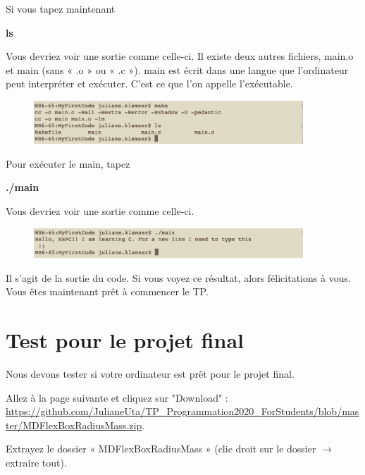 \documentclass{article}
\begin{document}
Si vous tapez maintenant 
\begin{tcolorbox}[width=\textwidth,colframe=Bittersweet,colback={black},title={Ceci est le terminal},outer arc=0mm,colupper=white]   
      \large\textbf{ ls}
\end{tcolorbox}
Vous devriez voir une sortie comme celle-ci. Il existe deux autres fichiers, main.o et main (sans « .o » ou « .c »). main est écrit dans une langue que l'ordinateur peut interpréter et exécuter. C'est ce que l'on appelle l'exécutable.
 \begin{figure}[H]
\center
\includegraphics[width=0.9\textwidth]{Plots/FirstCode_7.png}
\end{figure}
Pour exécuter le main, tapez
\begin{tcolorbox}[width=\textwidth,colframe=Bittersweet,colback={black},title={Ceci est le terminal},outer arc=0mm,colupper=white]   
      \large\textbf{ ./main}
\end{tcolorbox}
Vous devriez voir une sortie comme celle-ci. 
\begin{figure}[H]
\center
\includegraphics[width=0.9\textwidth]{Plots/FirstCode_8.png}
\end{figure}
Il s'agit de la sortie du code. Si vous voyez ce résultat, alors félicitations à vous. Vous êtes maintenant prêt à commencer le TP.

\section{Test pour le projet final}
Nous devons tester si votre ordinateur est prêt pour le projet final.

Allez à la page suivante et cliquez sur "Download" : \\ \href{https://github.com/JulianeUta/TP_Programmation2020_ForStudents/blob/master/MDFlexBoxRadiusMass.zip}{https://github.com/JulianeUta/TP\_Programmation2020\_ForStudents/blob/master/MDFlexBoxRadiusMass.zip}.

Extrayez le dossier « MDFlexBoxRadiusMass » (clic droit sur le dossier $\rightarrow$ extraire tout). 
\end{document}
